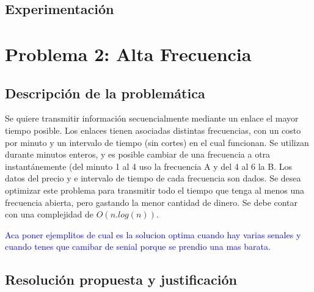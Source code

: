 \documentclass[a4paper]{article}
\begin{document}
\subsection{Experimentaci\'on}

\newpage

\section{Problema 2: Alta Frecuencia}
\subsection{Descripci\'on de la problem\'atica}

Se quiere transmitir informaci\'on secuencialmente mediante un enlace el mayor tiempo posible. Los enlaces tienen asociadas distintas frecuencias, con un costo por minuto y un intervalo de tiempo (sin cortes) en el cual funcionan. Se utilizan durante minutos enteros, y es posible cambiar de una frecuencia a otra instant\'anemente (del minuto 1 al 4 uso la frecuencia A y del 4 al 6 la B. Los datos del precio y e intervalo de tiempo de cada frecuencia son dados. Se desea optimizar este problema para transmitir todo el tiempo que tenga al menos una frecuencia abierta, pero gastando la menor cantidad de dinero. Se debe contar con una complejidad de $O(n.log(n))$.

\textcolor{blue}{Aca poner ejemplitos de cual es la solucion optima cuando hay varias senales y cuando tenes que camibar de senial porque se prendio una mas barata.}

\subsection{Resoluci\'on propuesta y justificaci\'on}



\end{document}
